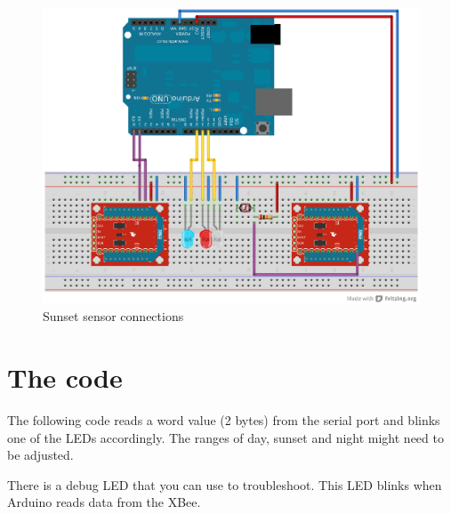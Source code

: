 \begin{figure}[htbp]
  \centering
  \includegraphics[width=0.9\linewidth]{figures/sunset_detector_fixedFINAL.eps}
  \caption{Sunset sensor connections}
  \label{fig:sunset_sensor}
\end{figure}

\section{The code}

The following code reads a word value (2 bytes) from the serial port and blinks one of the LEDs accordingly.
The ranges of day, sunset and night might need to be adjusted. 

There is a debug LED that you can use to troubleshoot.
This LED blinks when Arduino reads data from the XBee.


